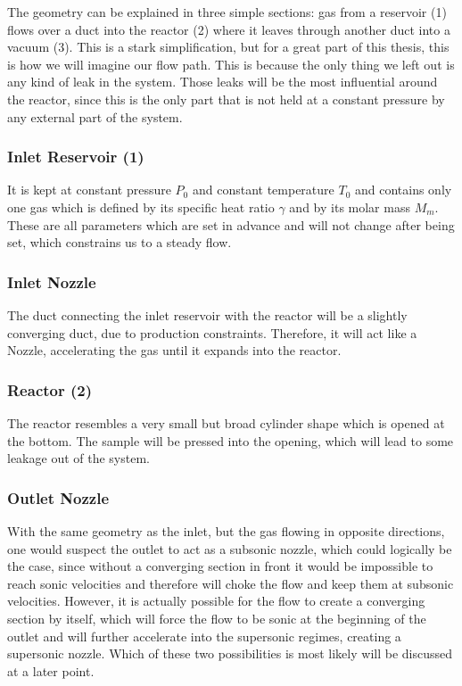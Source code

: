 	The geometry can be explained in three simple sections: gas from a reservoir (1) flows over a duct into the reactor (2) where it leaves through another duct into a vacuum (3).
	This is a stark simplification, but for a great part of this thesis, this is how we will imagine our flow path.
	This is because the only thing we left out is any kind of leak in the system.
	Those leaks will be the most influential around the reactor, since this is the only part that is not held at a constant pressure by any external part of the system.\\
	
\subsubsection{Inlet Reservoir (1)}

	It is kept at constant pressure \(P_0\) and constant temperature \(T_0\) and contains only one gas which is defined by its specific heat ratio \(\gamma\) and by its molar mass \(M_m\).
	These are all parameters which are set in advance and will not change after being set, which constrains us to a steady flow.
	
\subsubsection{Inlet Nozzle}

	The duct connecting the inlet reservoir with the reactor will be a slightly converging duct, due to production constraints.
	Therefore, it will act like a Nozzle, accelerating the gas until it expands into the reactor.
	
\subsubsection{Reactor (2)}
	
	The reactor resembles a very small but broad cylinder shape which is opened at the bottom.
	The sample will be pressed into the opening, which will lead to some leakage out of the system.
	
\subsubsection{Outlet Nozzle}
	
	With the same geometry as the inlet, but the gas flowing in opposite directions, one would suspect the outlet to act as a subsonic nozzle, which could logically be the case, since without a converging section in front it would be impossible to reach sonic velocities and therefore will choke the flow and keep them at subsonic velocities.
	However, it is actually possible for the flow to create a converging section by itself, which will force the flow to be sonic at the beginning of the outlet and will further accelerate into the supersonic regimes, creating a supersonic nozzle.
	Which of these two possibilities is most likely will be discussed at a later point.
	
